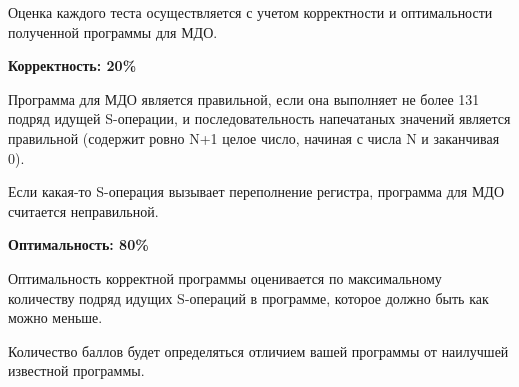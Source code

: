 Оценка каждого теста осуществляется с учетом корректности и оптимальности
полученной программы для МДО.

\textbf{Корректность: 20\%}

Программа для МДО является правильной, если она выполняет не более 131
подряд идущей S-операции, и последовательность напечатаных значений является
правильной (содержит ровно N+1 целое число, начиная с числа N и заканчивая 0).

Если какая-то S-операция вызывает переполнение регистра, программа для МДО
считается неправильной.

\textbf{Оптимальность: 80\%}

Оптимальность корректной программы оценивается по максимальному количеству
подряд идущих S-операций в программе, которое должно быть как можно меньше.

Количество баллов будет определяться отличием вашей программы от наилучшей
известной программы.